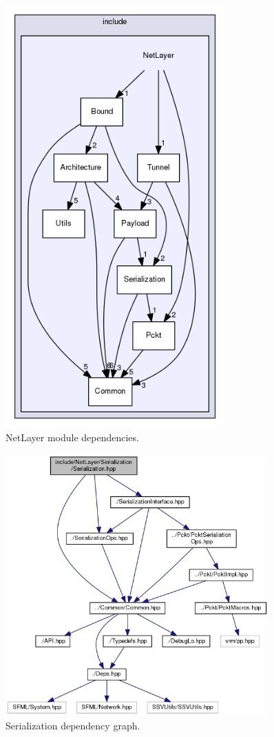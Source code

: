 \documentclass[12pt]{report}
\newcommand{\+}{\discretionary{\mbox{\scriptsize$\hookleftarrow$}}{}{}}
\begin{document}
    \begin{figure}[!htb]
    \caption{NetLayer module dependencies.}
    \centering
    \includegraphics[width=0.75\textwidth]{inc/deps.png}
    \end{figure}

    \begin{figure}[!htb]
    \caption{Serialization dependency graph.}
    \centering
    \includegraphics[width=0.9\textwidth]{inc/dep_ser.png}
    \end{figure}
\end{document}
